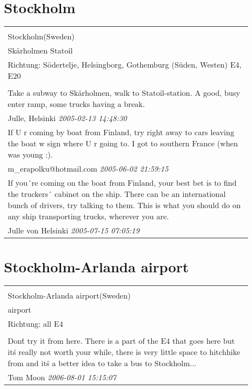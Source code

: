 \documentclass[a4paper,12pt]{article}
\begin{document}
\section{Stockholm}
\begin{tabular}{|p{13cm}|}
\hline\\
Stockholm(Sweden)\\
Skärholmen Statoil\\
Richtung: Södertelje, Helsingborg, Gothemburg (Süden, Westen) E4, E20 \\
\hline\\
Take a subway to Skärholmen, walk to Statoil-station. A good, busy enter ramp, some trucks having a break. \\
Julle, Helsinki \textit{ 2005-02-13 14:48:30 }\\\hline If U r coming by boat from Finland, try right away to cars leaving the boat w sign where U r going to. I got to southern France (when was young :). \\
m\_erapolku@hotmail.com \textit{ 2005-06-02 21:59:15 }\\\hline If you´re coming on the boat from Finland, your best bet is to find the truckers´ cabinet on the ship. There can be an international bunch of drivers, try talking to them. This is what you should do on any ship transporting trucks, wherever you are. \\
Julle von Helsinki \textit{ 2005-07-15 07:05:19 }\\\hline
\end{tabular}


\section{Stockholm-Arlanda airport}
\begin{tabular}{|p{13cm}|}
\hline\\
Stockholm-Arlanda airport(Sweden)\\
airport\\
Richtung: all E4 \\
\hline\\
Don\'t try it from here. There is a part of the E4 that goes here but it\'s really not worth your while, there is very little space to hitchhike from and it\'s a better idea to take a bus to Stockholm... \\
Tom Moon \textit{ 2006-08-01 15:15:07 }\\\hline
\end{tabular}
\end{document}
